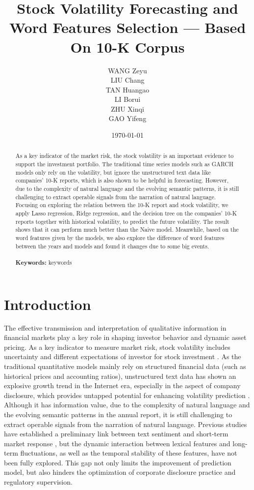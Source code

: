 \documentclass[11pt]{article}
\title{\vspace{-1.5cm} \huge Stock Volatility Forecasting and Word Features Selection --- Based On 10-K Corpus}
\author{
  \parbox{0.3\textwidth}{
    \centering WANG Zeyu
    \vspace{.25cm}
  }
  \parbox{0.3\textwidth}{
    \centering LIU Chang
    \vspace{.25cm}
  }
  \parbox{0.3\textwidth}{
    \centering TAN Huangao
    \vspace{.25cm}
  }
  \parbox{0.3\textwidth}{
    \centering LI Borui
  }
  \parbox{0.3\textwidth}{
    \centering ZHU Xinqi
  }
  \parbox{0.3\textwidth}{
    \centering GAO Yifeng
  }
}
\date{\today}
\begin{document}
\maketitle
\thispagestyle{empty}
\setcounter{page}{0}

\begin{abstract}
  As a key indicator of the market risk, the stock volatility is an important evidence to support the investment portfolio. The traditional time series models such as GARCH models only rely on the volatility, but ignore the unstructured text data like companies' 10-K reports, which is also shown to be helpful in forecasting. However, due to the complexity of natural language and the evolving semantic patterns, it is still challenging to extract operable signals from the narration of natural language. Focusing on exploring the relation between the 10-K report and stock volatility, we apply Lasso regression, Ridge regression, and the decision tree on the companies' 10-K reports together with historical volatility, to predict the future volatility. The result shows that it can perform much better than the Naive model. Meanwhile, based on the word features given by the models, we also explore the difference of word features between the years and models and found it changes due to some big events.
  \\\\
  \textbf{Keywords:} keywords
\end{abstract}

\newpage

\section{Introduction}

The effective transmission and interpretation of qualitative information in financial markets play a key role in shaping investor behavior and dynamic asset pricing. As a key indicator to measure market risk, stock volatility includes uncertainty and different expectations of investor for stock investment \cite{RePEc:eee:finlet:v:69:y:2024:i:pb:s1544612324011929} . As the traditional quantitative models mainly rely on structured financial data (such as historical prices and accounting ratios), unstructured text data has shown an explosive growth trend in the Internet era, especially in the aspect of company disclosure, which provides untapped potential for enhancing volatility prediction \cite{Ma2024} . Although it has information value, due to the complexity of natural language and the evolving semantic patterns in the annual report, it is still challenging to extract operable signals from the narration of natural language. Previous studies have established a preliminary link between text sentiment and short-term market response \cite{li2022sentiment} , but the dynamic interaction between lexical features and long-term fluctuations, as well as the temporal stability of these features, have not been fully explored. This gap not only limits the improvement of prediction model, but also hinders the optimization of corporate disclosure practice and regulatory supervision.
\end{document}
